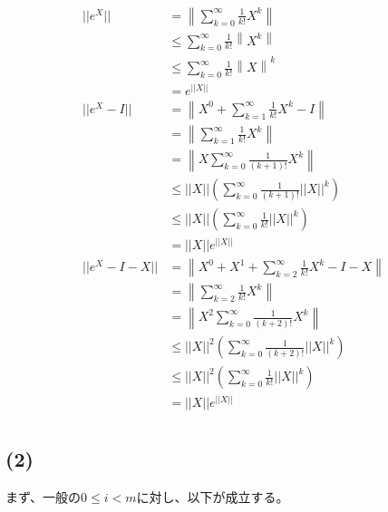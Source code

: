 \documentclass[a4paper, 10pt, dvipdfmx]{jlreq}
\begin{document}
\begin{align*}
  ||e^X||     & =\left\lVert \sum_{k=0}^\infty \frac{1}{k!}X^k\right\rVert                 \\
              & \leq \sum_{k=0}^\infty \frac{1}{k!}\left\lVert X^k\right\rVert             \\
              & \leq \sum_{k=0}^\infty \frac{1}{k!}\left\lVert X\right\rVert^k             \\
              & =e^{||X||}                                                                 \\
  ||e^X-I||   & =\left\lVert X^0+ \sum_{k=1}^\infty \frac{1}{k!}X^k -I\right\rVert         \\
              & =\left\lVert \sum_{k=1}^\infty \frac{1}{k!}X^k\right\rVert                 \\
              & =\left\lVert X\sum_{k=0}^\infty \frac{1}{(k+1)!}X^k\right\rVert            \\
              & \leq ||X||\left( \sum_{k=0}^{\infty} \frac{1}{(k+1)!} ||X||^k \right)      \\
              & \leq ||X||\left( \sum_{k=0}^{\infty} \frac{1}{k!} ||X||^k \right)          \\
              & =||X||e^{||X||}                                                            \\
  ||e^X-I-X|| & =\left\lVert X^0+X^1 +\sum_{k=2}^\infty \frac{1}{k!}X^k -I - X\right\rVert \\
              & =\left\lVert \sum_{k=2}^\infty \frac{1}{k!}X^k\right\rVert                 \\
              & =\left\lVert X^2 \sum_{k=0}^\infty \frac{1}{(k+2)!}X^k\right\rVert         \\
              & \leq ||X||^2\left( \sum_{k=0}^{\infty} \frac{1}{(k+2)!} ||X||^k \right)    \\
              & \leq ||X||^2\left( \sum_{k=0}^{\infty} \frac{1}{k!} ||X||^k \right)        \\
              & =||X||e^{||X||}                                                            \\
\end{align*}

\subsection*{(2)}

まず、一般の$0\leq i < m$に対し、以下が成立する。
\end{document}
